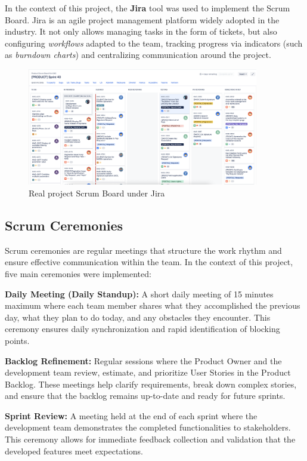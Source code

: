 In the context of this project, the \textbf{Jira} tool was used to implement the Scrum Board. 
Jira is an agile project management platform widely adopted in the industry. 
It not only allows managing tasks in the form of tickets, but also configuring \textit{workflows} adapted to the team, tracking progress via indicators (such as \textit{burndown charts}) and centralizing communication around the project.  

\begin{figure}[H]
    \centering
    \includegraphics[width=0.9\textwidth]{images/jira_scrum_board.png}
    \caption{Real project Scrum Board under Jira}
\end{figure}

\subsection{Scrum Ceremonies}

Scrum ceremonies are regular meetings that structure the work rhythm and ensure effective communication within the team. In the context of this project, five main ceremonies were implemented:

\noindent
\textbf{Daily Meeting (Daily Standup):} A short daily meeting of 15 minutes maximum where each team member shares what they accomplished the previous day, what they plan to do today, and any obstacles they encounter. This ceremony ensures daily synchronization and rapid identification of blocking points.

\noindent
\textbf{Backlog Refinement:} Regular sessions where the Product Owner and the development team review, estimate, and prioritize User Stories in the Product Backlog. These meetings help clarify requirements, break down complex stories, and ensure that the backlog remains up-to-date and ready for future sprints.

\noindent
\textbf{Sprint Review:} A meeting held at the end of each sprint where the development team demonstrates the completed functionalities to stakeholders. This ceremony allows for immediate feedback collection and validation that the developed features meet expectations.

